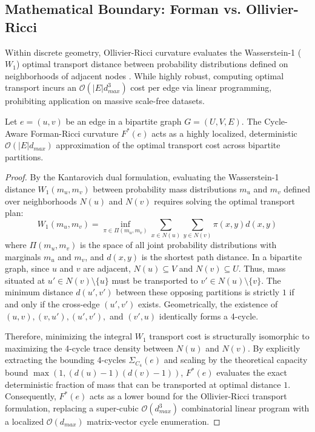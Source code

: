 \documentclass{siuro250211}
\begin{document}
\subsection{Mathematical Boundary: Forman vs. Ollivier-Ricci}
Within discrete geometry, Ollivier-Ricci curvature evaluates the Wasserstein-1 ($W_1$) optimal transport distance between probability distributions defined on neighborhoods of adjacent nodes \cite{samal2018comparative}. While highly robust, computing optimal transport incurs an $\mathcal{O}(|E| d_{max}^3)$ cost per edge via linear programming, prohibiting application on massive scale-free datasets. 

\begin{theorem}
Let $e = (u,v)$ be an edge in a bipartite graph $G=(U,V,E)$. The Cycle-Aware Forman-Ricci curvature $F^*(e)$ acts as a highly localized, deterministic $\mathcal{O}(|E| d_{max})$ approximation of the optimal transport cost across bipartite partitions.
\end{theorem}

\begin{proof}
By the Kantarovich dual formulation, evaluating the Wasserstein-1 distance $W_1(m_u, m_v)$ between probability mass distributions $m_u$ and $m_v$ defined over neighborhoods $N(u)$ and $N(v)$ requires solving the optimal transport plan:
\begin{equation}
W_1(m_u, m_v) = \inf_{\pi \in \Pi(m_u, m_v)} \sum_{x \in N(u)} \sum_{y \in N(v)} \pi(x, y) d(x, y)
\end{equation}
where $\Pi(m_u, m_v)$ is the space of all joint probability distributions with marginals $m_u$ and $m_v$, and $d(x,y)$ is the shortest path distance. In a bipartite graph, since $u$ and $v$ are adjacent, $N(u) \subseteq V$ and $N(v) \subseteq U$. Thus, mass situated at $u' \in N(v) \setminus \{u\}$ must be transported to $v' \in N(u) \setminus \{v\}$. The minimum distance $d(u', v')$ between these opposing partitions is strictly $1$ if and only if the cross-edge $(u', v')$ exists. Geometrically, the existence of $(u, v), (v, u'), (u', v'),$ and $(v', u)$ identically forms a 4-cycle.

Therefore, minimizing the integral $W_1$ transport cost is structurally isomorphic to maximizing the 4-cycle trace density between $N(u)$ and $N(v)$. By explicitly extracting the bounding 4-cycles $\Sigma_{C_4}(e)$ and scaling by the theoretical capacity bound $\max(1, (d(u)-1)(d(v)-1))$, $F^*(e)$ evaluates the exact deterministic fraction of mass that can be transported at optimal distance $1$. Consequently, $F^*(e)$ acts as a lower bound for the Ollivier-Ricci transport formulation, replacing a super-cubic $\mathcal{O}(d^3_{max})$ combinatorial linear program with a localized $\mathcal{O}(d_{max})$ matrix-vector cycle enumeration.
\end{proof}
\end{document}
